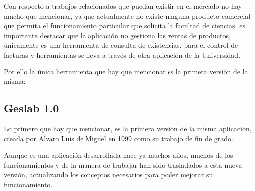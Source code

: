 
Con respecto a trabajos relacionados que puedan existir en el mercado no hay mucho que mencionar, ya que actualmente no existe ninguna producto comercial que permita el funcionamiento particular que solicita la facultad de ciencias. es importante destacar que la aplicación no gestiona las ventas de productos, únicamente es una herramienta de consulta de existencias, para el control de facturas y herramientas se lleva a través de otra aplicación de la Universidad.

Por ello la única herramienta que hay que mencionar es la primera versión de la misma:

\subsection{Geslab 1.0}
Lo primero que hay que mencionar, es la primera versión de la misma aplicación, creada por Alvaro Luis de Miguel en 1999 como su trabajo de fin de grado. 

Aunque es una aplicación desarrollada hace ya muchos años, muchos de los funcionamientos y de la manera de trabajar han sido trasladados a esta nueva versión, actualizando los conceptos necesarios para poder mejorar su funcionamiento.

